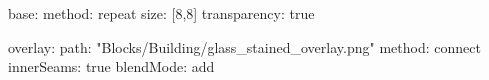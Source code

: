 base:
  method: repeat
  size: [8,8]
  transparency: true
  
overlay:
  path: "Blocks/Building/glass_stained_overlay.png"
  method: connect
  innerSeams: true
  blendMode: add
